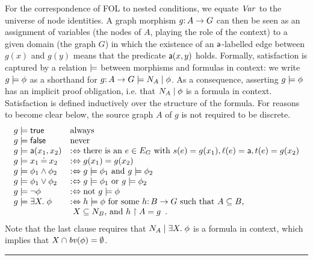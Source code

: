 For the correspondence of FOL to nested conditions, we equate $\mathit{Var}$ to the universe of node identities. A graph morphism $g{:}\, A\rightarrow G$ can then be seen as an assignment of variables (the nodes of $A$, playing the role of the context) to a given domain (the graph $G$) in which the existence of an $\mathsf{a}$-labelled edge between $g(x)$ and $g(y)$ means that the predicate $\mathsf{a}(x,y)$ holds. Formally, satisfaction is captured by a relation $\models$ between morphisms and formulas in context: we write $g \models \phi$ as a shorthand for $g {:}\, A \rightarrow G \models {N_A} \mid {\phi}$. As a consequence, asserting $g \models \phi$ has an implicit proof obligation, i.e. that ${N_A} \mid {\phi}$ is a formula in context.  Satisfaction is defined inductively over the structure of the formula.
For reasons to become clear below, the source graph $A$ of $g$ is not required to be discrete.
%
\[\begin{array}{ll}
g\models \mathsf{true} & \text{always} \\
g\models \mathsf{false} & \text{never} \\
g\models \mathsf{a}(x_1,x_2) & :\Leftrightarrow \text{there is an } e\in E_G \text{ with } s(e)=g(x_1), \ell(e)=\mathsf{a}, t(e)=g(x_2) \\
g\models x_1\mathbin{\doteq} x_2 & :\Leftrightarrow g(x_1)=g(x_2) \\
g\models \phi_1\wedge \phi_2 & :\Leftrightarrow g\models \phi_1 \text{ and } g\models \phi_2 \\
g\models \phi_1\vee \phi_2 & :\Leftrightarrow g\models \phi_1 \text{ or } g\models \phi_2 \\
g\models \neg\phi & :\Leftrightarrow \text{not } g\models \phi \\
g\models \exists X.\; \phi  & :\Leftrightarrow h\models \phi \text{ for some $h{:}\, B \rightarrow G$ such that $A \subseteq B$,}\\
& \text{ $X \subseteq N_B$, and }  h\restriction A = g\enspace.
\end{array}\]
%
Note that the last clause requires that ${N_A} \mid {\exists X.\;\phi}$ is a formula in context, which implies that $X \cap \mathit{bv}(\phi) = \emptyset$.

\bigskip

\hrule

\medskip
{}

